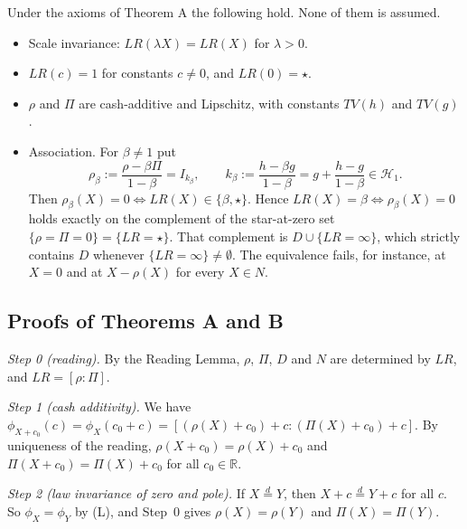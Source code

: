 \begin{proposition}
Under the axioms of Theorem A the following hold. None of them is assumed.
\begin{itemize}
\item Scale invariance: $LR(\lambda X)=LR(X)$ for $\lambda>0$.
\item $LR(c)=1$ for constants $c\neq 0$, and $LR(0)=\star$.
\item $\rho$ and $\Pi$ are cash-additive and Lipschitz, with constants $TV(h)$ and $TV(g)$.
\item Association. For $\beta\neq1$ put
\[
\rho_\beta:=\frac{\rho-\beta\Pi}{1-\beta}=I_{k_\beta},\qquad k_\beta:=\frac{h-\beta g}{1-\beta}=g+\frac{h-g}{1-\beta}\in\mathcal H_1 .
\]
Then $\rho_\beta(X)=0\iff LR(X)\in\{\beta,\star\}$. Hence $LR(X)=\beta\iff\rho_\beta(X)=0$ holds exactly on the complement of the star-at-zero set $\{\rho=\Pi=0\}=\{LR=\star\}$. That complement is $D\cup\{LR=\infty\}$, which strictly contains $D$ whenever $\{LR=\infty\}\neq\emptyset$. The equivalence fails, for instance, at $X=0$ and at $X-\rho(X)$ for every $X\in N$.
\end{itemize}
\end{proposition}

\subsection{Proofs of Theorems A and B}

\textit{Step 0 (reading).} By the Reading Lemma, $\rho$, $\Pi$, $D$ and $N$ are determined by $LR$, and $LR=[\rho:\Pi]$.

\textit{Step 1 (cash additivity).} We have $\phi_{X+c_0}(c)=\phi_X(c_0+c)=[(\rho(X)+c_0)+c:(\Pi(X)+c_0)+c]$. By uniqueness of the reading, $\rho(X+c_0)=\rho(X)+c_0$ and $\Pi(X+c_0)=\Pi(X)+c_0$ for all $c_0\in\mathbb R$.

\textit{Step 2 (law invariance of zero and pole).} If $X\overset d=Y$, then $X+c\overset d=Y+c$ for all $c$. So $\phi_X=\phi_Y$ by (L), and Step~0 gives $\rho(X)=\rho(Y)$ and $\Pi(X)=\Pi(Y)$.

